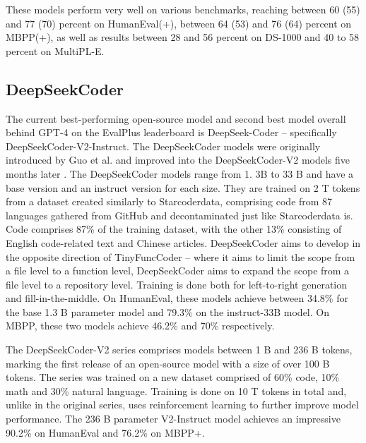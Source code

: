 These models perform very well on various benchmarks, reaching between 60 (55) and 77 (70) percent on HumanEval(+), between 64 (53) and 76 (64) percent on MBPP(+), as well as results between 28 and 56 percent on DS-1000 and 40 to 58 percent on MultiPL-E.


\subsection{DeepSeekCoder}
\label{sec:deepseek}

The current best-performing open-source model and second best model overall behind GPT-4 on the EvalPlus leaderboard is DeepSeek-Coder -- specifically DeepSeekCoder-V2-Instruct.
The DeepSeekCoder models were originally introduced by Guo et al. \cite{Guo.2024} and improved into the DeepSeekCoder-V2 models five months later \cite{DeepSeekAI.2024}.
The DeepSeekCoder models range from 1. 3B to 33 B and have a base version and an instruct version for each size.
They are trained on 2 T tokens from a dataset created similarly to Starcoderdata, comprising code from 87 languages gathered from GitHub and decontaminated just like Starcoderdata is.
Code comprises 87\% of the training dataset, with the other 13\% consisting of English code-related text and Chinese articles.
DeepSeekCoder aims to develop in the opposite direction of TinyFuncCoder -- where it aims to limit the scope from a file level to a function level, DeepSeekCoder aims to expand the scope from a file level to a repository level.
Training is done both for left-to-right generation and fill-in-the-middle.
On HumanEval, these models achieve between 34.8\% for the base 1.3 B parameter model and 79.3\% on the instruct-33B model.
On MBPP, these two models achieve 46.2\% and 70\% respectively.

The DeepSeekCoder-V2 series comprises models between 1 B and 236 B tokens, marking the first release of an open-source model with a size of over 100 B tokens.
The series was trained on a new dataset comprised of 60\% code, 10\% math and 30\% natural language.
Training is done on 10 T tokens in total and, unlike in the original series, uses reinforcement learning to further improve model performance.
The 236 B parameter V2-Instruct model achieves an impressive 90.2\% on HumanEval and 76.2\% on MBPP+.